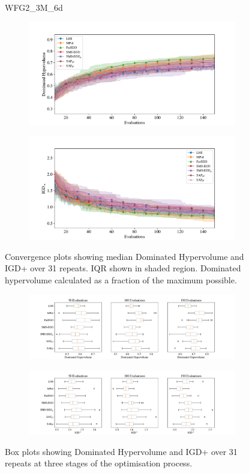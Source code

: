 \documentclass[conference]{IEEEtran}
\begin{document}
\begin{figure}
WFG2\_3M\_6d


\begin{subfigure}[hbt!]{\linewidth}

    \centering
    \includegraphics[width=0.7\linewidth]{figures/wfg2_3obj_6dim_hv_plot.pdf}
\end{subfigure}
\begin{subfigure}[h]{\linewidth}
    \centering
    \includegraphics[width=0.7\linewidth]{figures/wfg2_3obj_6dim_igd_plot.pdf}
\end{subfigure}
    \caption{Convergence plots showing median Dominated Hypervolume and IGD+ over 31 repeats. IQR shown in shaded region. Dominated hypervolume calculated as a fraction of the maximum possible.}
\vspace{\floatsep}
\begin{subfigure}[t]{\linewidth}
    \centering
    \includegraphics[width=0.8\linewidth]{figures/wfg2_3obj_6dim_hv_boxplot.pdf}
\end{subfigure}
\begin{subfigure}[t]{\linewidth}
    \centering
    \includegraphics[width=0.8\linewidth]{figures/wfg2_3obj_6dim_igd_boxplot.pdf}
\end{subfigure}
    \caption{Box plots showing Dominated Hypervolume and IGD+ over 31 repeats at three stages of the optimisation process.}
\end{figure}
\end{document}
